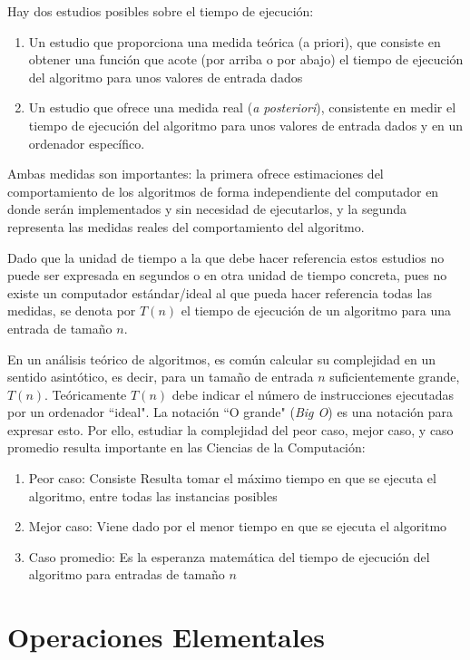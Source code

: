 Hay dos estudios posibles sobre el tiempo de ejecución:

\begin{enumerate}
\item Un estudio que proporciona una medida teórica (a priori), que consiste en obtener una función que acote (por arriba o por abajo) el tiempo de ejecución del algoritmo para unos valores de entrada dados
\item Un estudio que ofrece una medida real (\textit{a posteriori}), consistente en medir el tiempo de ejecución del algoritmo para unos valores de entrada dados y en un
ordenador específico. 
\end{enumerate}

Ambas medidas son importantes: la primera ofrece estimaciones del comportamiento de los algoritmos de forma independiente del computador en donde serán implementados y sin necesidad de ejecutarlos, y la segunda representa las medidas reales del comportamiento del algoritmo.

Dado que la unidad de tiempo a la que debe hacer referencia estos estudios no puede ser expresada en segundos o en otra unidad de tiempo concreta, pues no existe un computador estándar/ideal al que pueda hacer referencia todas las medidas, se denota por $T(n)$ el tiempo de ejecución de un algoritmo para una entrada de tamaño $n$. 

En un análisis teórico de algoritmos, es común calcular su complejidad en un sentido asintótico, es decir, para un tamaño de entrada $n$ suficientemente grande, $T(n)$. Teóricamente $T(n)$ debe indicar el número de instrucciones ejecutadas por un
ordenador ``ideal". La notación ``O grande" (\textit{Big O}) es una notación para expresar esto. Por ello, estudiar la complejidad del peor caso, mejor caso, y caso promedio resulta importante en las Ciencias de la Computación:

\begin{enumerate}
\item Peor caso: Consiste Resulta tomar el máximo tiempo en que se ejecuta el algoritmo, entre todas las instancias posibles
\item Mejor caso: Viene dado por el menor tiempo en que se ejecuta el algoritmo
\item Caso promedio: Es la esperanza matemática del tiempo de ejecución del algoritmo para entradas de tamaño $n$
\end{enumerate}

\section{Operaciones Elementales}


